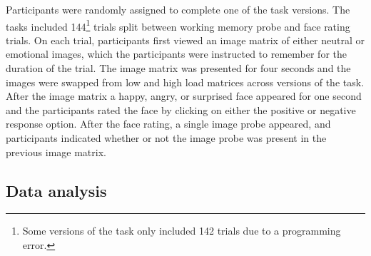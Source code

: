\documentclass[man]{apa6}
\let\rmarkdownfootnote\footnote%
\def\footnote{\protect\rmarkdownfootnote}
\begin{document}
Participants were randomly assigned to complete one of the task versions. The tasks included 144\footnote{Some versions of the task only included 142 trials due to a programming error.} trials split between working memory probe and face rating trials. On each trial, participants first viewed an image matrix of either neutral or emotional images, which the participants were instructed to remember for the duration of the trial. The image matrix was presented for four seconds and the images were swapped from low and high load matrices across versions of the task. After the image matrix a happy, angry, or surprised face appeared for one second and the participants rated the face by clicking on either the positive or negative response option. After the face rating, a single image probe appeared, and participants indicated whether or not the image probe was present in the previous image matrix.

\hypertarget{data-analysis}{%
\subsection{Data analysis}\label{data-analysis}}
\end{document}
